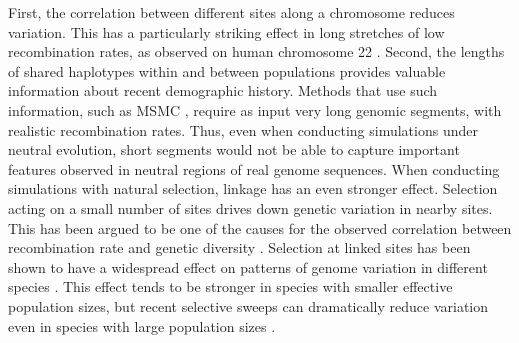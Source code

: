\documentclass[hidelinks]{article}
\begin{document}
First, the correlation between different sites along a chromosome reduces
variation. This has a particularly striking effect in long stretches of
low recombination rates, as observed on human chromosome 22 \citep{Dawson2002}.
Second, the lengths of shared haplotypes within and
between populations provides valuable information about recent demographic history.
Methods that use such information, such as MSMC \citep{Schiffels2020}, require as
input very long genomic segments, with realistic recombination rates.
Thus, even when conducting simulations under neutral evolution, short segments
would not be able to capture important features observed in neutral regions of
real genome sequences.
%
%
%
When conducting simulations with natural selection, linkage has
an even stronger effect. Selection acting on a small number of sites drives down
genetic variation in nearby sites. This has been argued to be one of the causes
for the observed correlation between recombination rate and genetic diversity
\citep{Begun1992}. Selection at linked sites has been shown to have a widespread
effect on patterns of genome variation in different species \citep{McVicker2009,Charlesworth2012}. This effect tends to be stronger in species
with smaller effective population sizes, but recent selective sweeps can dramatically
reduce variation even in species with large population sizes \citep{Lynd2010}.
%
%
%
\end{document}
